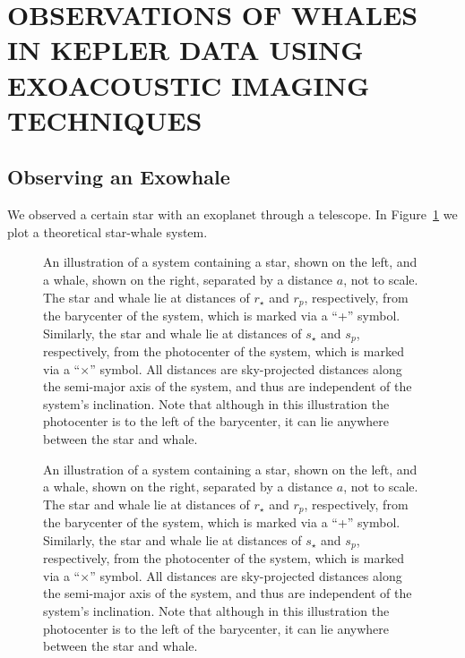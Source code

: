 \label{chap2}
\section{\MakeUppercase{Observations of Whales in Kepler Data Using Exoacoustic Imaging Techniques}}

\subsection{Observing an Exowhale}
\label{exowhaleobs}

We observed a certain star with an exoplanet through a telescope. In Figure~\ref{whalefig1} we plot a theoretical star-whale system. 

\begin{figure}  %
\centering
{}
\caption[Whales are Everywhere (short caption example)]{An illustration of a system containing a star, shown on the left, and a whale, shown on the right, separated by a distance $a$, not to scale. The star and whale lie at distances of $r_{\star}$ and $r_{p}$, respectively, from the barycenter of the system, which is marked via a ``+'' symbol. Similarly, the star and whale lie at distances of $s_{\star}$ and $s_{p}$, respectively, from the photocenter of the system, which is marked via a ``$\times$'' symbol. All distances are sky-projected distances along the semi-major axis of the system, and thus are independent of the system's inclination. Note that although in this illustration the photocenter is to the left of the barycenter, it can lie anywhere between the star and whale.}
\label{whalefig1}
\end{figure}

\begin{figure}[h]  %
\centering
{}
\caption[Whales are Everywhere (short caption example)]{An illustration of a system containing a star, shown on the left, and a whale, shown on the right, separated by a distance $a$, not to scale. The star and whale lie at distances of $r_{\star}$ and $r_{p}$, respectively, from the barycenter of the system, which is marked via a ``+'' symbol. Similarly, the star and whale lie at distances of $s_{\star}$ and $s_{p}$, respectively, from the photocenter of the system, which is marked via a ``$\times$'' symbol. All distances are sky-projected distances along the semi-major axis of the system, and thus are independent of the system's inclination. Note that although in this illustration the photocenter is to the left of the barycenter, it can lie anywhere between the star and whale.}
\label{whalefig1a}
\end{figure}


